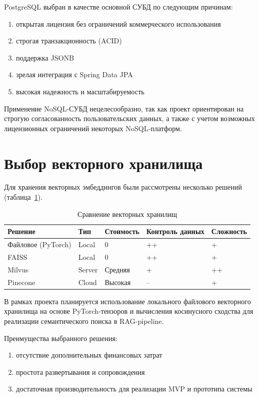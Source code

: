 PostgreSQL выбран в качестве основной СУБД по следующим причинам:

\begin{enumerate}
	\item открытая лицензия без ограничений коммерческого использования
	\item строгая транзакционность (ACID)
	\item поддержка JSONB
	\item зрелая интеграция с Spring Data JPA
	\item высокая надежность и масштабируемость
\end{enumerate}

Применение NoSQL-СУБД нецелесообразно, так как проект ориентирован на строгую согласованность пользовательских данных, а также с учетом возможных лицензионных ограничений некоторых NoSQL-платформ.


\section{Выбор векторного хранилища}


Для хранения векторных эмбеддингов были рассмотрены несколько решений (таблица~\ref{tab:vector}).


\begin{table}[htbp]
	\centering
	\caption{Сравнение векторных хранилищ}
	\label{tab:vector}
	\small
	
\begin{tabular}{|p{2.2cm}|p{2.2cm}|p{2.2cm}|p{2.2cm}|p{2.2cm}|}
	\hline
		Решение & Тип & Стоимость & Контроль данных & Сложность \\
	\hline
		Файловое (PyTorch) & Local & 0 & ++ & + \\
	\hline
		FAISS & Local & 0 & ++ & + \\
	\hline
		Milvus & Server & Средняя & + & ++ \\
	\hline
		Pinecone & Cloud & Высокая & -- & + \\
	\hline
	\end{tabular}

\end{table}


В рамках проекта планируется использование локального файлового векторного хранилища на основе PyTorch-тензоров и вычисления косинусного сходства для реализации семантического поиска в RAG-pipeline.


Преимущества выбранного решения:

\begin{enumerate}
	\item отсутствие дополнительных финансовых затрат
	\item простота развертывания и сопровождения
	\item достаточная производительность для реализации MVP и прототипа системы
\end{enumerate}

